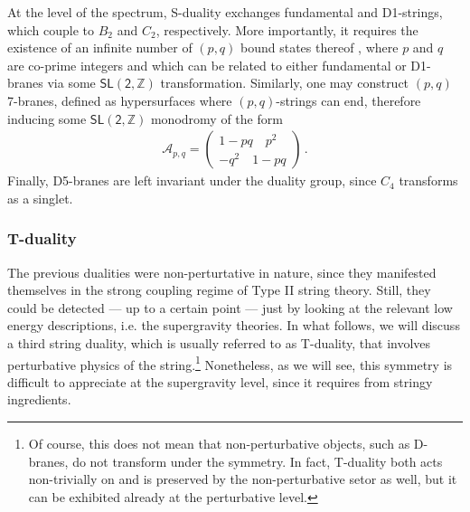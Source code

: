 At the level of the spectrum, S-duality exchanges fundamental and D1-strings, which couple to $B_2$ and $C_2$, respectively. More importantly, it requires the existence of an infinite number of $(p, q)$ bound states thereof \cite{Schwarz:1995dk}, where $p$ and $q$ are co-prime integers \cite{Witten:1995im} and which can be related to either fundamental or D1-branes via some $\mathsf{SL (2,\mathbb{Z})}$ transformation. Similarly, one may construct $(p, q)$ 7-branes, defined as hypersurfaces where $(p, q)$-strings can end, therefore inducing some $\mathsf{SL (2,\mathbb{Z})}$ monodromy of the form\cite{Weigand:2010wm}
%
\begin{align}
	\mathcal{A}_{p,q}=\begin{pmatrix}
		1-pq \quad  p^2\\-q^2 \quad  1-pq
	\end{pmatrix}\, .
\end{align}
%
Finally, D5-branes are left invariant under the duality group, since $C_4$ transforms as a singlet.

\subsubsection*{T-duality}

The previous dualities were non-perturtative in nature, since they manifested themselves in the strong coupling regime of Type II string theory. Still, they could be detected --- up to a certain point --- just by looking at the relevant low energy descriptions, i.e. the supergravity theories. In what follows, we will discuss a third string duality, which is usually referred to as T-duality, that involves perturbative physics of the string.\footnote{Of course, this does not mean that non-perturbative objects, such as D-branes, do not transform under the symmetry. In fact, T-duality both acts non-trivially on and is preserved by the non-perturbative setor as well, but it can be exhibited already at the perturbative level.} Nonetheless, as we will see, this symmetry is difficult to appreciate at the supergravity level, since it requires from stringy ingredients.

